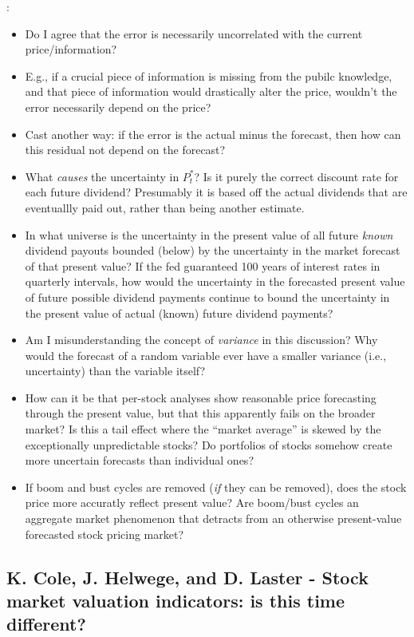 \note{[Consider]}:
\begin{itemize}
    \item Do I agree that the error is necessarily uncorrelated with the current price/information?
    \item E.g., if a crucial piece of information is missing from the pubilc knowledge, and that piece of information would drastically alter the price, wouldn't the error necessarily depend on the price?
    \item Cast another way: if the error is the actual minus the forecast, then how can this residual not depend on the forecast?
    \item What {\it causes} the uncertainty in $P_t^*$?  Is it purely the correct discount rate for each future dividend?  Presumably it is based off the actual dividends that are eventuallly paid out, rather than being another estimate.
    \item In what universe is the uncertainty in the present value of all future {\it known} dividend payouts bounded (below) by the uncertainty in the market forecast of that present value?  If the fed guaranteed 100 years of interest rates in quarterly intervals, how would the uncertainty in the forecasted present value of future possible dividend payments continue to bound the uncertainty in the present value of actual (known) future dividend payments?
    \item Am I misunderstanding the concept of {\it variance} in this discussion?  Why would the forecast of a random variable ever have a smaller variance (i.e., uncertainty) than the variable itself?
    \item How can it be that per-stock analyses show reasonable price forecasting through the present value, but that this apparently fails on the broader market?  Is this a tail effect where the ``market average'' is skewed by the exceptionally unpredictable stocks?  Do portfolios of stocks somehow create more uncertain forecasts than individual ones?
    \item If boom and bust cycles are removed ({\it if} they can be removed), does the stock price more accuratly reflect present value?  Are boom/bust cycles an aggregate market phenomenon that detracts from an otherwise present-value forecasted stock pricing market?
\end{itemize}


\subsection{K. Cole, J. Helwege, and D. Laster - Stock market valuation indicators: is this time different?}

